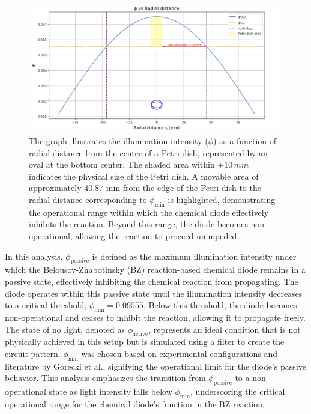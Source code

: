 \begin{figure}[h]
    \centering
    \includegraphics[width=\textwidth]{images/Screenshot 2024-03-22 at 09.42.18.png}
    \caption{The graph illustrates the illumination intensity (\( \phi \)) as a function of radial distance from the center of a Petri dish, represented by an oval at the bottom center. The shaded area within \(\pm 10\,mm\) indicates the physical size of the Petri dish. A movable area of approximately 40.87 mm from the edge of the Petri dish to the radial distance corresponding to \( \phi_{\min} \) is highlighted, demonstrating the operational range within which the chemical diode effectively inhibits the reaction. Beyond this range, the diode becomes non-operational, allowing the reaction to proceed unimpeded.}
    \label{fig:petri-dish-illumination}
\end{figure}

In this analysis, \( \phi_{\text{passive}} \) is defined as the maximum illumination intensity under which the Belousov-Zhabotinsky (BZ) reaction-based chemical diode remains in a passive state, effectively inhibiting the chemical reaction from propagating. The diode operates within this passive state until the illumination intensity decreases to a critical threshold, \( \phi_{\min} = 0.09555 \). Below this threshold, the diode becomes non-operational and ceases to inhibit the reaction, allowing it to propagate freely. The state of no light, denoted as \( \phi_{\text{active}} \), represents an ideal condition that is not physically achieved in this setup but is simulated using a filter to create the circuit pattern. \( \phi_{\min} \) was chosen based on experimental configurations and literature by Gorecki et al., signifying the operational limit for the diode's passive behavior. This analysis emphasizes the transition from \( \phi_{\text{passive}} \) to a non-operational state as light intensity falls below \( \phi_{\min} \), underscoring the critical operational range for the chemical diode's function in the BZ reaction.

